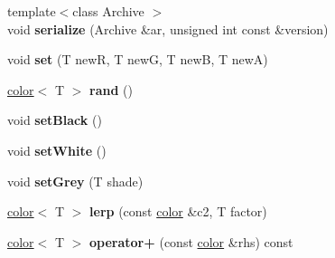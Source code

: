 \begin{DoxyCompactItemize}
\item 
\hypertarget{classNeb_1_1Color_1_1color_af9fdc2ecbaef12c6adb05f77aaddc470}{{\footnotesize template$<$class Archive $>$ }\\void {\bfseries serialize} (Archive \&ar, unsigned int const \&version)}\label{classNeb_1_1Color_1_1color_af9fdc2ecbaef12c6adb05f77aaddc470}

\item 
\hypertarget{classNeb_1_1Color_1_1color_a0e1bf847047b917322f4ab3fca23e4af}{void {\bfseries set} (T new\-R, T new\-G, T new\-B, T new\-A)}\label{classNeb_1_1Color_1_1color_a0e1bf847047b917322f4ab3fca23e4af}

\item 
\hypertarget{classNeb_1_1Color_1_1color_a3f3767f4606d53d83bbe3757ab4c4677}{\hyperlink{classNeb_1_1Color_1_1color}{color}$<$ T $>$ {\bfseries rand} ()}\label{classNeb_1_1Color_1_1color_a3f3767f4606d53d83bbe3757ab4c4677}

\item 
\hypertarget{classNeb_1_1Color_1_1color_a2370eaf8a8b98a5747dcfcda64706989}{void {\bfseries set\-Black} ()}\label{classNeb_1_1Color_1_1color_a2370eaf8a8b98a5747dcfcda64706989}

\item 
\hypertarget{classNeb_1_1Color_1_1color_a68097596e5e47611a255e0c9dddce0fc}{void {\bfseries set\-White} ()}\label{classNeb_1_1Color_1_1color_a68097596e5e47611a255e0c9dddce0fc}

\item 
\hypertarget{classNeb_1_1Color_1_1color_aa8bb28a6ea4d64d8e4cee4768c2b6c83}{void {\bfseries set\-Grey} (T shade)}\label{classNeb_1_1Color_1_1color_aa8bb28a6ea4d64d8e4cee4768c2b6c83}

\item 
\hypertarget{classNeb_1_1Color_1_1color_a63ad81955607967426738d1ebdc8ee87}{\hyperlink{classNeb_1_1Color_1_1color}{color}$<$ T $>$ {\bfseries lerp} (const \hyperlink{classNeb_1_1Color_1_1color}{color} \&c2, T factor)}\label{classNeb_1_1Color_1_1color_a63ad81955607967426738d1ebdc8ee87}

\item 
\hypertarget{classNeb_1_1Color_1_1color_ae56aa7160b7802e9dcbbd089827ef60b}{\hyperlink{classNeb_1_1Color_1_1color}{color}$<$ T $>$ {\bfseries operator+} (const \hyperlink{classNeb_1_1Color_1_1color}{color} \&rhs) const }\label{classNeb_1_1Color_1_1color_ae56aa7160b7802e9dcbbd089827ef60b}


\end{DoxyCompactItemize}
